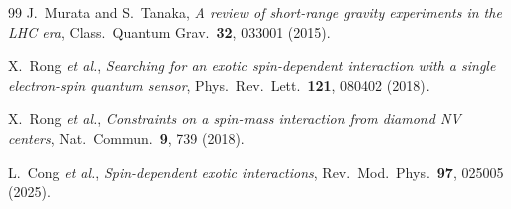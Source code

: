 \documentclass[12pt,a4paper]{report}
\begin{document}
\begin{thebibliography}{99}
J.~Murata and S.~Tanaka,
\textit{A review of short-range gravity experiments in the LHC era},
Class.\ Quantum Grav.\ \textbf{32}, 033001 (2015).

X.~Rong \textit{et al.},
\textit{Searching for an exotic spin-dependent interaction with a single
electron-spin quantum sensor},
Phys.\ Rev.\ Lett.\ \textbf{121}, 080402 (2018).

X.~Rong \textit{et al.},
\textit{Constraints on a spin-mass interaction from diamond NV centers},
Nat.\ Commun.\ \textbf{9}, 739 (2018).

L.~Cong \textit{et al.},
\textit{Spin-dependent exotic interactions},
Rev.\ Mod.\ Phys.\ \textbf{97}, 025005 (2025).

\end{thebibliography}
\end{document}
